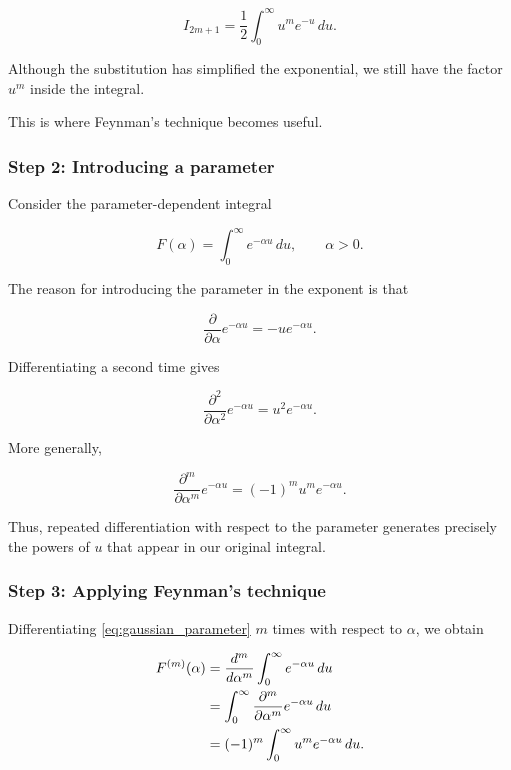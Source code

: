 \documentclass[11pt,a4paper]{article}
\theoremstyle{definition}
\theoremstyle{remark}
\begin{document}
\begin{equation}
    I_{2m+1}
    =
    \frac{1}{2}
    \int_0^\infty u^m e^{-u}\,du.
    \label{eq:gaussian_odd_substitution}
\end{equation}

Although the substitution has
simplified the exponential,
we still have the factor $u^m$
inside the integral.

This is where Feynman's technique
becomes useful.

\subsubsection*{Step 2: Introducing a parameter}

Consider the parameter-dependent
integral

\begin{equation}
    F(\alpha)
    =
    \int_0^\infty e^{-\alpha u}\,du,
    \qquad \alpha>0.
    \label{eq:gaussian_parameter}
\end{equation}

The reason for introducing the
parameter in the exponent is that

\[
    \frac{\partial}{\partial\alpha}
    e^{-\alpha u}
    =
    -u e^{-\alpha u}.
\]

Differentiating a second time gives

\[
    \frac{\partial^2}{\partial\alpha^2}
    e^{-\alpha u}
    =
    u^2 e^{-\alpha u}.
\]

More generally,

\begin{equation}
    \frac{\partial^m}{\partial\alpha^m}
    e^{-\alpha u}
    =
    (-1)^m u^m e^{-\alpha u}.
    \label{eq:gaussian_parameter_derivative}
\end{equation}

Thus, repeated differentiation
with respect to the parameter
generates precisely the powers
of $u$ that appear in our
original integral.

\subsubsection*{Step 3: Applying Feynman's technique}

Differentiating
\eqref{eq:gaussian_parameter}
$m$ times with respect to
$\alpha$, we obtain

\begin{align}
    F^{(m)}(\alpha)
    &=
    \frac{d^m}{d\alpha^m}
    \int_0^\infty e^{-\alpha u}\,du
    \notag\\
    &=
    \int_0^\infty
    \frac{\partial^m}{\partial\alpha^m}
    e^{-\alpha u}\,du
    \notag\\
    &=
    (-1)^m
    \int_0^\infty
    u^m e^{-\alpha u}\,du.
    \label{eq:gaussian_odd_differentiation}
\end{align}
\end{document}
